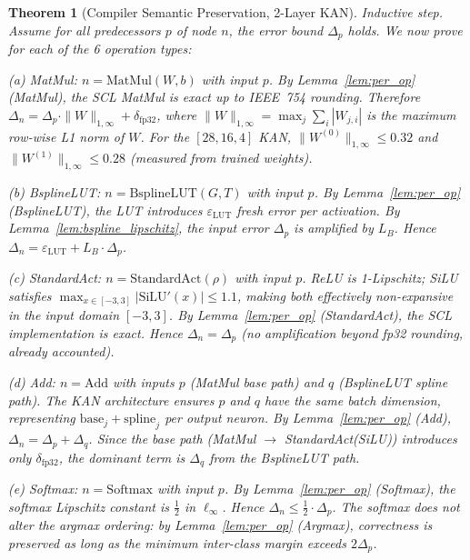 \documentclass[journal,onecolumn]{IEEEtran}
\newtheorem{theorem}{Theorem}
\begin{document}
\begin{theorem}[Compiler Semantic Preservation, 2-Layer KAN]
\textit{Inductive step.} Assume for all predecessors $p$ of node $n$,
the error bound $\Delta_p$ holds. We now prove for each of the 6
operation types:

\vspace{2pt}
\noindent\textit{(a) MatMul:} $n = \text{MatMul}(W,b)$ with input $p$.
By Lemma~\ref{lem:per_op} (MatMul), the SCL MatMul is exact up to IEEE~754 rounding.
Therefore $\Delta_n = \Delta_p \cdot \|W\|_{1,\infty} + \delta_{\text{fp32}}$,
where $\|W\|_{1,\infty} = \max_j \sum_i |W_{j,i}|$ is the maximum
row-wise L1 norm of $W$. For the $[28,16,4]$ KAN,
$\|W^{(0)}\|_{1,\infty} \leq 0.32$ and $\|W^{(1)}\|_{1,\infty}
\leq 0.28$ (measured from trained weights).

\vspace{2pt}
\noindent\textit{(b) BsplineLUT:} $n = \text{BsplineLUT}(G,T)$ with
input $p$. By Lemma~\ref{lem:per_op} (BsplineLUT), the LUT introduces $\varepsilon_{\text{LUT}}$
fresh error per activation. By Lemma~\ref{lem:bspline_lipschitz}, the input error $\Delta_p$ is
amplified by $L_B$. Hence $\Delta_n = \varepsilon_{\text{LUT}} + L_B
\cdot \Delta_p$.

\vspace{2pt}
\noindent\textit{(c) StandardAct:} $n = \text{StandardAct}(\rho)$ with
input $p$. ReLU is 1-Lipschitz; SiLU satisfies $\max_{x\in[-3,3]}|\text{SiLU}'(x)| \leq 1.1$, making both effectively non-expansive in the input domain
$[-3,3]$. By Lemma~\ref{lem:per_op} (StandardAct), the SCL implementation is exact. Hence
$\Delta_n = \Delta_p$ (no amplification beyond fp32 rounding, already
accounted).

\vspace{2pt}
\noindent\textit{(d) Add:} $n = \text{Add}$ with inputs $p$ (MatMul
base path) and $q$ (BsplineLUT spline path). The KAN architecture
ensures $p$ and $q$ have the same batch dimension, representing
$\text{base}_j + \text{spline}_j$ per output neuron. By Lemma~\ref{lem:per_op} (Add),
$\Delta_n = \Delta_p + \Delta_q$. Since the base path (MatMul $\to$
StandardAct(SiLU)) introduces only $\delta_{\text{fp32}}$, the
dominant term is $\Delta_q$ from the BsplineLUT path.

\vspace{2pt}
\noindent\textit{(e) Softmax:} $n = \text{Softmax}$ with input $p$.
By Lemma~\ref{lem:per_op} (Softmax), the softmax Lipschitz constant is $\frac{1}{2}$ in $\ell_\infty$.
Hence $\Delta_n \leq \frac{1}{2} \cdot \Delta_p$. The softmax does not alter
the argmax ordering: by Lemma~\ref{lem:per_op} (Argmax), correctness is preserved as long as
the minimum inter-class margin exceeds $2\Delta_p$.


\end{theorem}
\end{document}
